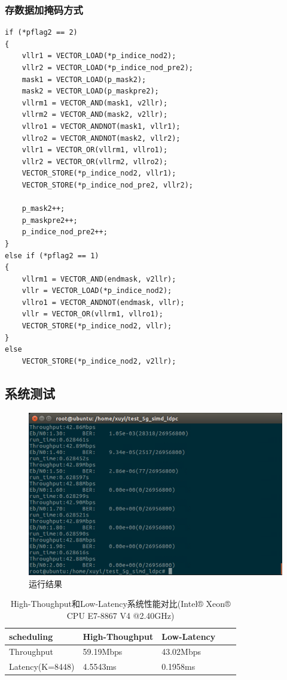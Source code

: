 \documentclass{article}
\begin{document}
\subsubsection{存数据加掩码方式}
\begin{lstlisting}
if (*pflag2 == 2)
{
	vllr1 = VECTOR_LOAD(*p_indice_nod2);
	vllr2 = VECTOR_LOAD(*p_indice_nod_pre2);
	mask1 = VECTOR_LOAD(p_mask2);
	mask2 = VECTOR_LOAD(p_maskpre2);
	vllrm1 = VECTOR_AND(mask1, v2llr);
	vllrm2 = VECTOR_AND(mask2, v2llr);
	vllro1 = VECTOR_ANDNOT(mask1, vllr1);
	vllro2 = VECTOR_ANDNOT(mask2, vllr2);
	vllr1 = VECTOR_OR(vllrm1, vllro1);
	vllr2 = VECTOR_OR(vllrm2, vllro2);
	VECTOR_STORE(*p_indice_nod2, vllr1);
	VECTOR_STORE(*p_indice_nod_pre2, vllr2);

	p_mask2++;
	p_maskpre2++;
	p_indice_nod_pre2++;
}
else if (*pflag2 == 1)
{
	vllrm1 = VECTOR_AND(endmask, v2llr);
	vllr = VECTOR_LOAD(*p_indice_nod2);
	vllro1 = VECTOR_ANDNOT(endmask, vllr);						
	vllr = VECTOR_OR(vllrm1, vllro1);
	VECTOR_STORE(*p_indice_nod2, vllr);
}
else
	VECTOR_STORE(*p_indice_nod2, v2llr);
\end{lstlisting}

\subsection{系统测试}
\begin{figure}[H]
	\centering
	\includegraphics[width = .8\textwidth]{llres.png}
	\caption{运行结果}
\end{figure}
\begin{table}[H]
	\caption{High-Thoughput和Low-Latency系统性能对比(Intel® Xeon® CPU E7-8867 V4 @2.40GHz)}
	\centering
	\begin{tabular}{|l|l|l|l|l|}%
		\hline  %
		scheduling	& High-Thoughput& Low-Latency	\\
		\hline
		Throughput	& 59.19Mbps	& 43.02Mbps	\\
		\hline
		Latency(K=8448)	& 4.5543ms	& 0.1958ms	\\
		\hline  %
	\end{tabular}
\end{table}
\end{document}
